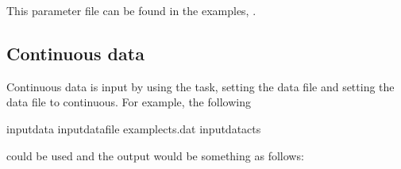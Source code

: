 \documentclass[letterpaper,10pt,english]{sphinxmanual}
\begin{document}
\sphinxAtStartPar
This parameter file can be found  in the examples, .


\subsection{Continuous data}
\label{\detokenize{input-data:continuous-data}}\label{\detokenize{input-data:input-data-cts}}
\sphinxAtStartPar
Continuous data is input by using the  task, setting the data file and setting the data file to continuous. For example, the following

\begin{sphinxVerbatim}[commandchars=\\\{\}]
\PYGZhy{}input\PYGZhy{}data
\PYGZhy{}input\PYGZhy{}data\PYGZhy{}file example\PYGZhy{}cts.dat
\PYGZhy{}input\PYGZhy{}data\PYGZhy{}cts
\end{sphinxVerbatim}

\sphinxAtStartPar
could be used and the output would be something as follows:
\end{document}
